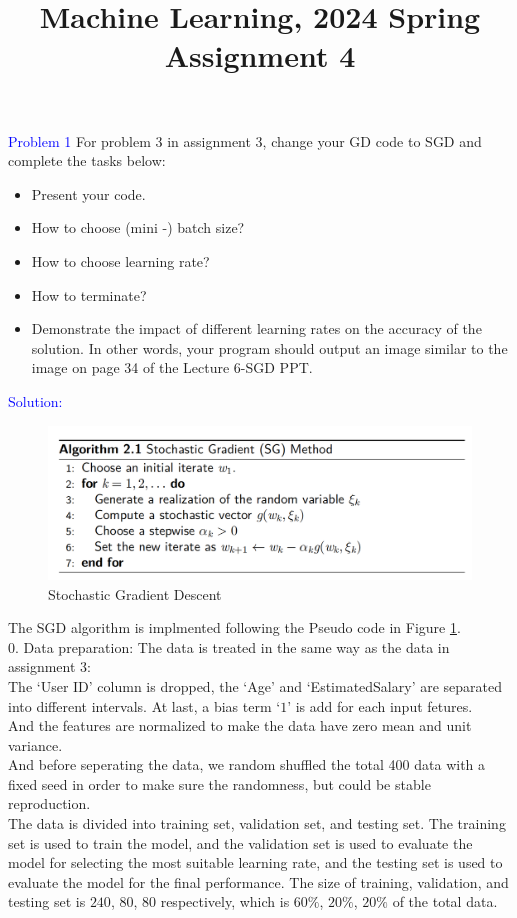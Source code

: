 \documentclass{article}
\title{Machine Learning, 2024 Spring\\Assignment 4}
\begin{document}
\maketitle

\begin{abstract}

\end{abstract}

\textcolor{blue}{Problem 1}
For problem 3 in assignment 3, change your GD code to SGD and complete the tasks below:
\begin{itemize}
	\item Present your code.
    \item How to choose (mini -) batch size?
    \item How to choose learning rate?
    \item How to terminate?
    \item Demonstrate the impact of different learning rates on the accuracy of the solution. In other words, your program should  output an image similar to the image on page 34 of the Lecture 6-SGD PPT.
\end{itemize}

\textcolor{blue}{Solution:}\\
\begin{figure}[htbp]
  \includegraphics[width=\textwidth]{../image/alg.png}
  \caption{Stochastic Gradient Descent}
\label{fig:SGD}
\end{figure}

The SGD algorithm is implmented following the Pseudo code in Figure \ref{fig:SGD}.\\

0. Data preparation: The data is treated in the same way as the data in assignment 3:\\
The  `User ID' column is dropped, the `Age' and `EstimatedSalary' are separated into different intervals. At last, a bias term `$1$' is add for each input fetures.\\
And the features are normalized to make the data have zero mean and unit variance.\\
And before seperating the data, we random shuffled the total 400 data with a fixed seed in order to make sure the randomness, but could be stable reproduction.\\
The data is divided into training set, validation set, and testing set. The training set is used to train the model, and the validation set is used to evaluate the model for selecting the most suitable learning rate, and the testing set is used to evaluate the model for the final performance. 
The size of training, validation, and testing set is $240$, $80$, $80$ respectively, which is $60\%$, $20\%$, $20\%$ of the total data.
\end{document}
